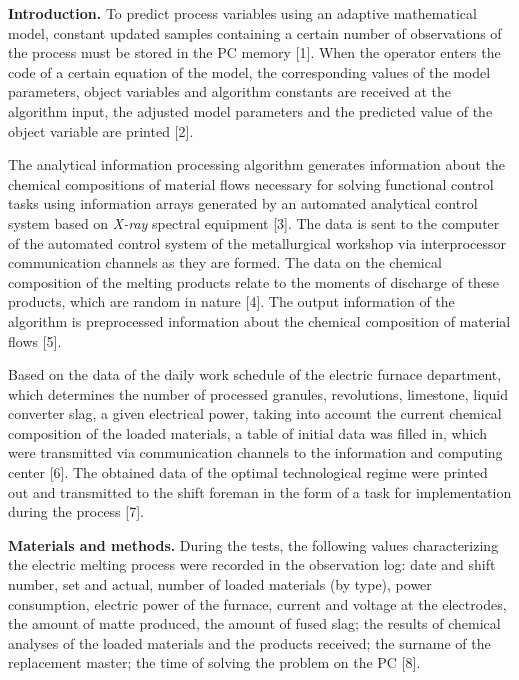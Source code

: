 \begin{multicols}{2}
{\bfseries Introduction.} To predict process variables using an adaptive
mathematical model, constant updated samples containing a certain number
of observations of the process must be stored in the PC memory {[}1{]}.
When the operator enters the code of a certain equation of the model,
the corresponding values of the model parameters, object variables and
algorithm constants are received at the algorithm input, the adjusted
model parameters and the predicted value of the object variable are
printed {[}2{]}.

The analytical information processing algorithm generates information
about the chemical compositions of material flows necessary for solving
functional control tasks using information arrays generated by an
automated analytical control system based on \emph{X-ray} spectral
equipment {[}3{]}. The data is sent to the computer of the automated
control system of the metallurgical workshop via interprocessor
communication channels as they are formed. The data on the chemical
composition of the melting products relate to the moments of discharge
of these products, which are random in nature {[}4{]}. The output
information of the algorithm is preprocessed information about the
chemical composition of material flows {[}5{]}.

Based on the data of the daily work schedule of the electric furnace
department, which determines the number of processed granules,
revolutions, limestone, liquid converter slag, a given electrical power,
taking into account the current chemical composition of the loaded
materials, a table of initial data was filled in, which were transmitted
via communication channels to the information and computing center
{[}6{]}. The obtained data of the optimal technological regime were
printed out and transmitted to the shift foreman in the form of a task
for implementation during the process {[}7{]}.

{\bfseries Materials and methods.} During the tests, the following values
characterizing the electric melting process were recorded in the
observation log: date and shift number, set and actual, number of loaded
materials (by type), power consumption, electric power of the furnace,
current and voltage at the electrodes, the amount of matte produced, the
amount of fused slag; the results of chemical analyses of the loaded
materials and the products received; the surname of the replacement
master; the time of solving the problem on the PC {[}8{]}.


\end{multicols}
